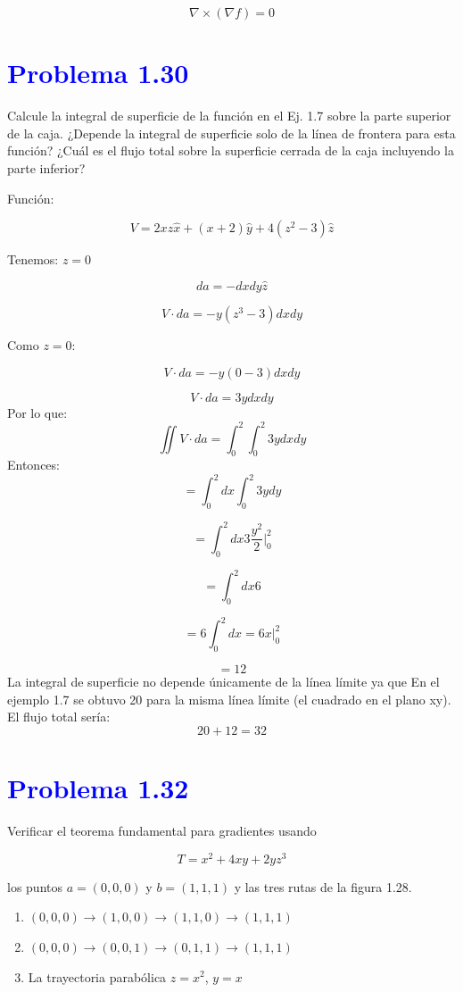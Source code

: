 \documentclass[12pt]{article}
\newcommand{\question}[1]{\textcolor{blue}{\textbf{#1}}}
\begin{document}
\[
\boxed{\nabla \times (\nabla f) = 0}
\]

\section*{\question{Problema  1.30}} Calcule la integral de superficie de la función en el Ej. 1.7 sobre la parte superior de la caja. ¿Depende la integral de superficie solo de la línea de frontera para esta función? ¿Cuál es el flujo total sobre la superficie cerrada de la caja incluyendo la parte inferior?

Función:

\[
V = 2x z \hat{x} + (x+2) \hat{y} + 4(z^2 - 3) \hat{z}
\]

Tenemos: \( z=0 \)

\[
da = -dxdy \hat{z}
\]

\[
V \cdot da = -y (z^3 -3) dxdy
\]

Como \( z=0 \):

\[
V \cdot da = -y(0-3)dxdy
\]

\[
V \cdot da = 3y dxdy
\]
Por lo que:
\[
\iint V \cdot da = \int_0^2 \int_0^2 3y dxdy
\]
Entonces:
\[
= \int_0^2 dx \int_0^2 3y dy
\]

\[
= \int_0^2 dx 3  \frac{y^2}{2}\Big|_0^2
\]

\[
= \int_0^2 dx 6
\]

\[
= 6 \int_0^2 dx = 6 x \Big|_0^2
\]

\[
\boxed{= 12}
\]
La integral de superficie no depende únicamente de la línea límite ya que En el ejemplo 1.7 se obtuvo 20 para la misma línea límite (el cuadrado en el plano xy).
 El flujo total sería: \[
    20 + 12 = \boxed{32}   \]

 \section*{\question{Problema  1.32}} Verificar el teorema fundamental para gradientes usando 

\[
T = x^2 + 4xy + 2y z^3
\]

los puntos \( a = (0,0,0) \) y \( b = (1,1,1) \) y las tres rutas de la figura 1.28.

\begin{enumerate}
    \item \( (0,0,0) \to (1,0,0) \to (1,1,0) \to (1,1,1) \)
    \item \( (0,0,0) \to (0,0,1) \to (0,1,1) \to (1,1,1) \)
    \item La trayectoria parabólica \( z = x^2 \), \( y = x \)
\end{enumerate}
\end{document}
